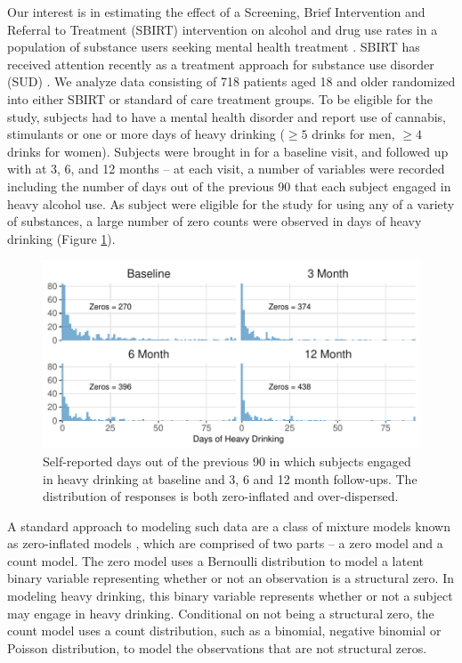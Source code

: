 \documentclass[12pt]{article}
\begin{document}
Our interest is in estimating the effect of a Screening, Brief Intervention and Referral to Treatment (SBIRT) intervention on alcohol and drug use rates in a population of substance users seeking mental health treatment \citep{karno2021effect}. SBIRT has received attention recently as a treatment approach for substance use disorder (SUD) \citep{saitz2014screening, glass2015specialty, barata2017effectiveness, tetrault2020computerized}. We analyze data consisting of 718 patients aged 18 and older randomized into either SBIRT or standard of care treatment groups. To be eligible for the study, subjects had to have a mental health disorder and report use of cannabis, stimulants or one or more days of heavy drinking ($\geq 5$ drinks for men, $\geq 4$ drinks for women). Subjects were brought in for a baseline visit, and followed up with at 3, 6, and 12 months -- at each visit, a number of variables were recorded including the number of days out of the previous 90 that each subject engaged in heavy alcohol use. As subject were eligible for the study for using any of a variety of substances, a large number of zero counts were observed in days of heavy drinking (Figure \ref{fig:inflation}).

\begin{figure}[ht]
	\centering
	\includegraphics[scale=1]{figures/inflation_heavy_plot.pdf}
	\caption{Self-reported days out of the previous 90 in which subjects engaged in heavy drinking at baseline and 3, 6 and 12 month follow-ups. The distribution of responses is both zero-inflated and over-dispersed.}
	\label{fig:inflation}
\end{figure}

A standard approach to modeling such data are a class of mixture models known as zero-inflated models \citep{cohen1966note, johnson2005univariate, ridout1998models}, which are comprised of two parts -- a zero model and a count model. The zero model uses a Bernoulli distribution to model a latent binary variable representing whether or not an observation is a structural zero. In modeling heavy drinking, this binary variable represents whether or not a subject may engage in heavy drinking. Conditional on not being a structural zero, the count model uses a count distribution, such as a binomial, negative binomial or Poisson distribution, to model the observations that are not structural zeros. 
\end{document}
